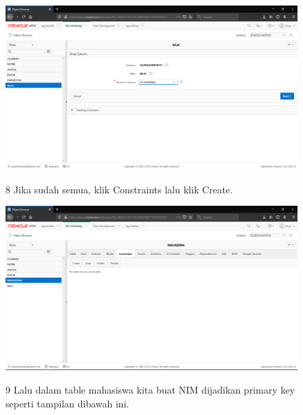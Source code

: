 \begin{enumerate}
\begin{figure}
    \begin{center}
\includegraphics[scale=0.2]{figures/16.png}
    \caption{\textit{}}
        \end{center}
\label{gambar}
\end{figure}

\begin{figure}
\item[8]Jika sudah semua, klik Constraints lalu klik Create.

    \begin{center}
\includegraphics[scale=0.2]{figures/20.png}
    \caption{\textit{}}
        \end{center}
\label{gambar}
\end{figure}

\begin{figure}
\item[9]Lalu dalam table mahasiswa kita buat NIM dijadikan primary key seperti tampilan dibawah ini.


\end{figure}
\end{enumerate}
